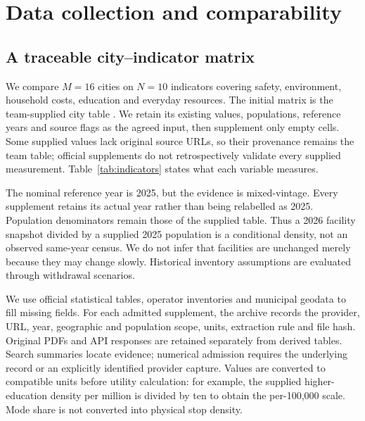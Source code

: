 \section{Data collection and comparability}
\subsection{A traceable city--indicator matrix}
We compare $M=16$ cities on $N=10$ indicators covering safety, environment,
household costs, education and everyday resources. The initial matrix is the
team-supplied city table \cite{teamtable}. We retain its existing values, populations, reference
years and source flags as the agreed input, then supplement only empty cells.
Some supplied values lack original source URLs, so their provenance remains
the team table; official supplements do not retrospectively validate every
supplied measurement. Table~\ref{tab:indicators} states what each variable measures.



The nominal reference year is 2025, but the evidence is mixed-vintage. Every
supplement retains its actual year rather than being relabelled as 2025.
Population denominators remain those of the supplied table. Thus a 2026 facility
snapshot divided by a supplied 2025 population is a conditional density, not an
observed same-year census. We do not infer that facilities are unchanged merely
because they may change slowly. Historical inventory assumptions are evaluated
through withdrawal scenarios.

We use official statistical tables, operator inventories and municipal geodata
to fill missing fields. For each admitted supplement, the archive records the
provider, URL, year, geographic and population scope, units, extraction rule and
file hash. Original PDFs and API responses are retained separately from derived
tables. Search summaries locate evidence; numerical admission requires the
underlying record or an explicitly identified provider capture. Values are
converted to compatible units before utility calculation: for example, the
supplied higher-education density per million is divided by ten to obtain the
per-100,000 scale. Mode share is not converted into physical stop density.

